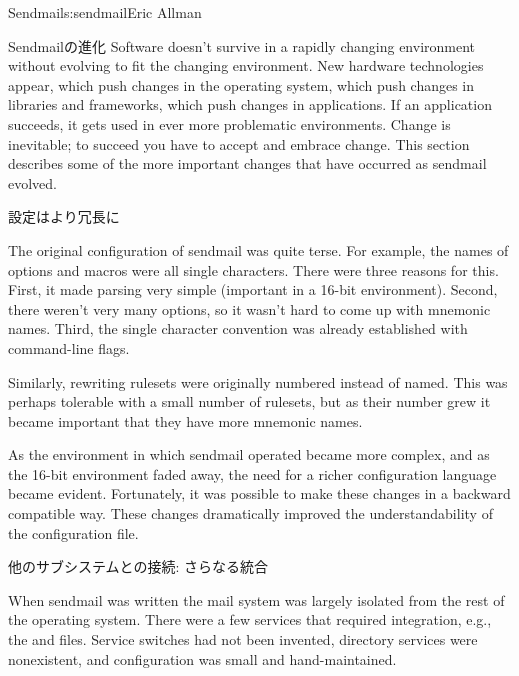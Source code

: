 \begin{aosachapter}{Sendmail}{s:sendmail}{Eric Allman}
\begin{aosasect1}{Sendmailの進化}
Software doesn't survive in a rapidly changing environment without
evolving to fit the changing environment. New hardware technologies
appear, which push changes in the operating system, which push changes
in libraries and frameworks, which push changes in applications. If an
application succeeds, it gets used in ever more problematic
environments.  Change is inevitable; to succeed you have to accept and
embrace change.  This section describes some of the more important
changes that have occurred as sendmail evolved.

\begin{aosasect2}{設定はより冗長に}

The original configuration of sendmail was quite terse. For example,
the names of options and macros were all single characters. There were
three reasons for this. First, it made parsing very simple (important in
a 16-bit environment). Second, there weren't very many options, so it
wasn't hard to come up with mnemonic names.
Third,
the single character convention was already established
with command-line flags.

Similarly, rewriting rulesets were originally numbered instead of
named. This was perhaps tolerable with a small number of rulesets, but
as their number grew it became important that they have more mnemonic
names.

As the environment in which sendmail operated became more complex, and
as the 16-bit environment faded away, the need for a richer
configuration language became evident. Fortunately, it was possible to
make these changes in a backward compatible way. These changes
dramatically improved the understandability of the configuration file.

\end{aosasect2}

\begin{aosasect2}{他のサブシステムとの接続: さらなる統合}

When sendmail was written the mail system was largely isolated from
the rest of the operating system.  There were a few services that
required integration, e.g., the  and
 files.  Service switches had not been invented,
directory services were nonexistent, and configuration was small and
hand-maintained.


\end{aosasect2}
\end{aosasect1}
\end{aosachapter}

